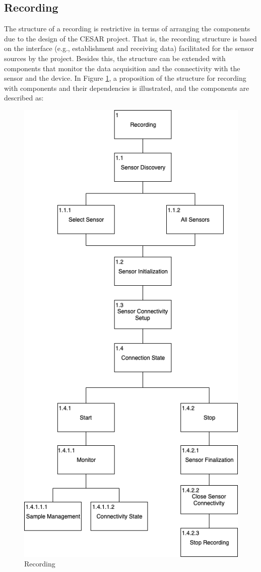 
\subsection{Recording}\label{soc:recording}
The structure of a recording is restrictive in terms of arranging the components due to the design of the CESAR project. That is, the recording structure is based on the interface (e.g., establishment and receiving data) facilitated for the sensor sources by the project. Besides this, the structure can be extended with components that monitor the data acquisition and the connectivity with the sensor and the device. In Figure \ref{fig:hta_recording}, a proposition of the structure for recording with components and their dependencies is illustrated, and the components are described as:

\begin{figure}
    \centering
    \includegraphics[scale=0.5]{images/Recording.png}
    \caption{Recording}
    \label{fig:hta_recording}
\end{figure}


